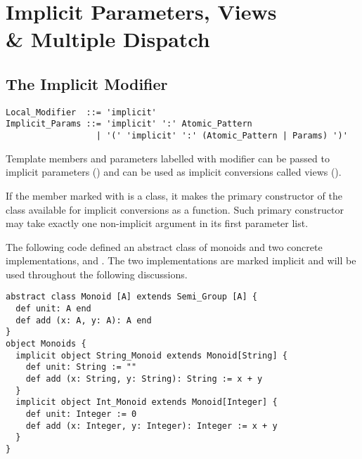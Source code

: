 
\chapter[Implicit Parameters, Views \& Multiple Dispatch]{Implicit Parameters, Views \\\& Multiple Dispatch}
\label{sec:implicit-params-views}
\label{sec:implicits}

\minitoc

\newpage





\section{The Implicit Modifier}
\label{sec:implicit-modifier}

\syntax\begin{lstlisting}
Local_Modifier  ::= 'implicit'
Implicit_Params ::= 'implicit' ':' Atomic_Pattern
                  | '(' 'implicit' ':' (Atomic_Pattern | Params) ')'
\end{lstlisting}

Template members and parameters labelled with  modifier can be passed to implicit parameters () and can be used as implicit conversions called views (). 

If the member marked with  is a class, it makes the primary constructor of the class available for implicit conversions as a function. Such primary constructor may take exactly one non-implicit argument in its first parameter list. 

\example\label{ex:impl-monoid} The following code defined an abstract class of monoids and two concrete implementations,  and . The two implementations are marked implicit and will be used throughout the following discussions. 
\begin{lstlisting}
abstract class Monoid [A] extends Semi_Group [A] {
  def unit: A end
  def add (x: A, y: A): A end
}
object Monoids {
  implicit object String_Monoid extends Monoid[String] {
    def unit: String := ""
    def add (x: String, y: String): String := x + y
  }
  implicit object Int_Monoid extends Monoid[Integer] {
    def unit: Integer := 0
    def add (x: Integer, y: Integer): Integer := x + y
  }
}
\end{lstlisting}






